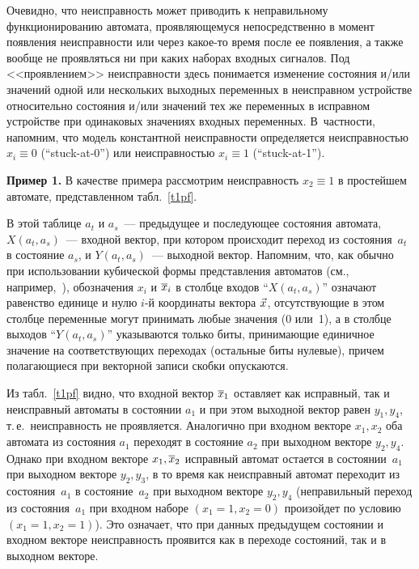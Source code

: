 \begin{multicols}{2}
 Очевидно, что неисправность может приводить к неправильному
функционированию автомата, проявляющемуся непосредственно в момент появления
неисправности или через какое-то время после ее появления, а также вообще не
проявляться ни при каких наборах входных сигналов.
Под <<проявлением>> неисправности здесь понимается изменение состояния и/или
значений одной или нескольких выходных переменных в неисправном устройстве
относительно состояния и/или значений тех же переменных в исправном устройстве
при одинаковых значениях входных переменных.
В~частности, напомним, что модель константной неисправности определяется
неисправностью $x_i \equiv 0$ (``stuck-at-0'') или неисправностью $x_i \equiv 1$
(``stuck-at-1'').

\medskip

\noindent
{\bf Пример 1.} В качестве примера рассмотрим неисправность $x_2 \equiv 1$
в простейшем автомате, пред\-став\-лен\-ном табл.~\ref{t1pf}.


В этой таблице $a_t$ и $a_s$~--- предыдущее и последующее состояния
автомата,
$X(a_t,a_s)$~--- входной вектор, при котором происходит переход из состояния~$a_t$
в состояние $a_s$, и $Y(a_t,a_s)$~--- выходной вектор.
Напомним, что, как обычно при использовании кубической формы представления
автоматов (см., например,~\cite{2, 8}), обозначения $x_i$ и $\overline x_i$ в столбце входов
``$X(a_t,a_s)$'' означают равенство единице и нулю $i$-й координаты вектора
$\vec x$, отсутствующие в этом столбце переменные могут принимать любые значения
(0 или~1), а в столбце выходов ``$Y(a_t,a_s)$'' указываются только биты,
принимающие единичное значение на соответствующих переходах (остальные биты
нулевые), причем полагающиеся при векторной записи скобки опускаются.

 Из табл.~\ref{t1pf} видно, что входной вектор $\overline x_1$ остав\-ля\-ет как исправный,
так и неисправный автоматы в состоянии $a_1$ и при этом
выходной вектор равен $y_1,y_4$, т.\,е.\ неисправность не проявляется.
Аналогично при входном векторе $x_1,x_2$ оба автомата из состояния $a_1$
переходят в состояние $a_2$ при выходном векторе $y_2,y_4$.
Однако при входном векторе $x_1,\overline x_2$ исправный автомат остается в состоянии~$a_1$
при выходном векторе $y_2,y_3$, в то время как
неисправный автомат переходит из состояния~$a_1$ в состояние~$a_2$ при
выходном векторе $y_2,y_4$ (неправильный переход из состояния~$a_1$ при входном
наборе $(x_1=1, x_2=0)$ произойдет по условию $(x_1=1, x_2=1)$).
Это означает, что при данных предыдущем состоянии и входном векторе
неисправность проявится как в переходе состояний, так и в выходном векторе.


\end{multicols}
